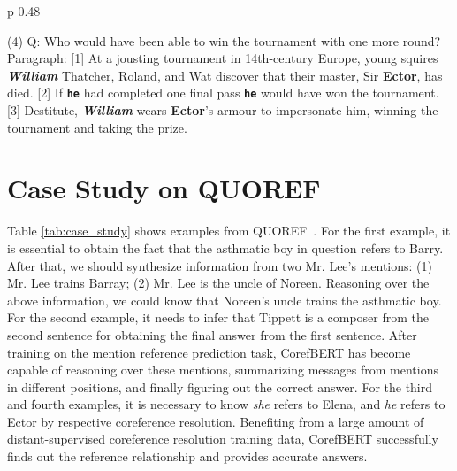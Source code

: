 \documentclass[11pt,a4paper]{article}
\newcommand\BASESIZE{$_{\small \textsc{base}}$\xspace}
\begin{document}
\begin{table}[!t]
\begin{center}
\begin{tabular}{p {0.48\textwidth}}
\midrule

(4) Q: Who would have been able to win the tournament with one more round? \\    
Paragraph: {\color{olive} [1]} At a jousting tournament in 14th-century Europe, young squires {\color{blue}\bf \textit{William}} Thatcher, Roland, and Wat discover that their master, Sir {\color{red} \bf Ector}, has died. {\color{olive} [2]} If {\color{rel} \bf \texttt{he}} had completed one final pass {\color{rel} \bf \texttt{he}} would have won the tournament. {\color{olive} [3]} Destitute, {\color{blue}\bf \textit{William}} wears {\color{red} \bf Ector}'s armour to impersonate him, winning the tournament and taking the prize.  \\


    \bottomrule
    \end{tabular}
    \end{center}
    \caption{ Examples from QUOREEF~\citep{QUOREF} that were correctly predicted by CorefBERT\BASESIZE, but wrongly predicted by BERT\BASESIZE. {\color{blue}\bf \textit{Answers from BERT\BASESIZE}}, {\color{red} \bf Answers from CorefBERT\BASESIZE}, and {\color{rel} \bf \texttt{Clue}} are colored respectively. }

    \label{tab:case_study}
\end{table}
\section{Case Study on QUOREF}

Table \ref{tab:case_study} shows examples from QUOREF~\citep{QUOREF}. For the first example, it is essential to obtain the fact that the asthmatic boy in question refers to Barry. After that, we should synthesize information from two Mr. Lee's mentions: (1) Mr. Lee trains Barray; (2) Mr. Lee is the uncle of Noreen. Reasoning over the above information,  we could know that Noreen's uncle trains the asthmatic boy. For the second example, it needs to infer that Tippett is a composer from the second sentence for obtaining the final answer from  the first sentence. After training on the mention reference prediction task, CorefBERT has become capable of reasoning over these mentions, summarizing messages from mentions in different positions, and finally figuring out the correct answer.
For the third and fourth examples, it is necessary to know \emph{she} refers to Elena, and \emph{he} refers to Ector by respective coreference resolution. Benefiting from a large amount of distant-supervised coreference resolution training data, CorefBERT successfully finds out the reference relationship and provides accurate answers.
\end{document}
